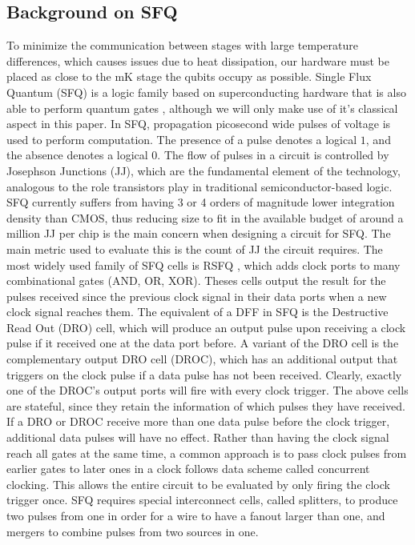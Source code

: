 \subsection{Background on SFQ}

To minimize the communication between stages with large temperature differences, which causes issues due to heat dissipation, our hardware must be placed as close to the mK stage the qubits occupy as possible.
Single Flux Quantum (SFQ) \cite{rsfq} is a logic family based on superconducting hardware that is also able to perform quantum gates \cite{sfqubit}, although we will only make use of it's classical aspect in this paper.
In SFQ, propagation picosecond wide pulses of voltage is used to perform computation.
The presence of a pulse denotes a logical $1$, and the absence denotes a logical $0$.
The flow of pulses in a circuit is controlled by Josephson Junctions (JJ), which are the fundamental element of the technology, analogous to the role transistors play in traditional semiconductor-based logic.
SFQ currently suffers from having 3 or 4 orders of magnitude lower integration density than CMOS, thus reducing size to fit in the available budget of around a million JJ per chip is the main concern when designing a circuit for SFQ.
The main metric used to evaluate this is the count of JJ the circuit requires.
The most widely used family of SFQ cells is RSFQ \cite{rsfq}, which adds clock ports to many combinational gates (AND, OR, XOR).
Theses cells output the result for the pulses received since the previous clock signal in their data ports when a new clock signal reaches them.
The equivalent of a DFF in SFQ is the Destructive Read Out (DRO) cell, which will produce an output pulse upon receiving a clock pulse if it received one at the data port before.
A variant of the DRO cell is the complementary output DRO cell (DROC), which has an additional output that triggers on the clock pulse if a data pulse has not been received.
Clearly, exactly one of the DROC's output ports will fire with every clock trigger.
The above cells are stateful, since they retain the information of which pulses they have received.
If a DRO or DROC receive more than one data pulse before the clock trigger, additional data pulses will have no effect.
Rather than having the clock signal reach all gates at the same time, a common approach is to pass clock pulses from earlier gates to later ones in a clock follows data scheme called concurrent clocking.
This allows the entire circuit to be evaluated by only firing the clock trigger once.
SFQ requires special interconnect cells, called splitters, to produce two pulses from one in order for a wire to have a fanout larger than one, and mergers to combine pulses from two sources in one.
